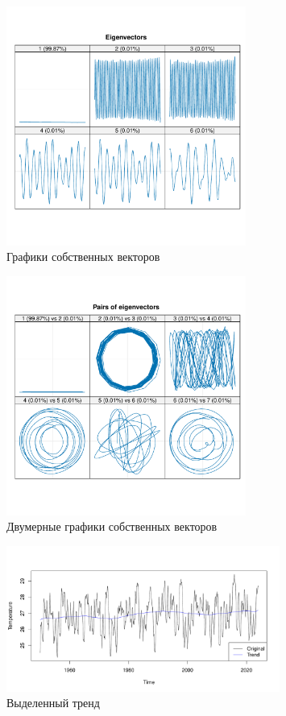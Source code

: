 \documentclass[specialist,
substylefile = spbu_report.rtx,
subf,href,colorlinks=true, 12pt]{disser}
\theoremstyle{definition}
\begin{document}
\begin{figure}[h!]
	\centering
	\includegraphics[width=0.7\textwidth]{img/Nino_ssa_vectors.pdf}
	\caption{Графики собственных векторов}
	\label{Nino_ssa_vectors}	
\end{figure}

\begin{figure}[h!]
	\centering
	\includegraphics[width=0.7\textwidth]{img/Nino_ssa_paired.pdf}
	\caption{Двумерные графики собственных векторов}
	\label{Nino_ssa_paired}
\end{figure}

\begin{figure}[h!]
	\centering
	\includegraphics[width=0.8\textwidth]{img/Nino_reconstruct_trend.pdf}
	\caption{Выделенный тренд}
	\label{Nino_reconstruct_trend}
\end{figure}
\end{document}
